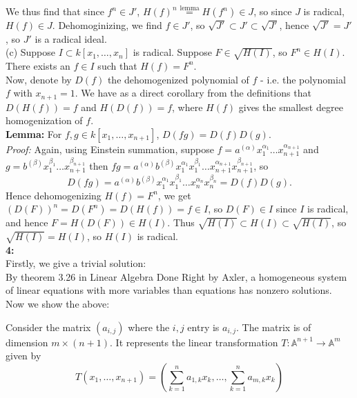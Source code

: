 \documentclass[a4paper]{article}
\begin{document}
We thus find that
since $f^{n} \in J'$, $H(f)^{n} \stackrel{\text{lemma}}{=} H(f^{n}) \in J$, so
since $J$ is radical, $H(f) \in J$. Dehomoginizing, we find
$f \in J'$, so $\sqrt{J'} \subset J' \subset \sqrt{J'} $, hence
$\sqrt{J'}  = J'$, so  $J'$ is a radical ideal.\\
\linebreak
(c) Suppose $I \subset k\left[ x_1, \ldots, x_n \right] $ is radical.
Suppose $F \in \sqrt{H(I)} $, so
$F^{n} \in H(I)$. There exists an $f \in I$ such that
$H(f) = F^{n}$.\\ Now, denote by
$D(f)$ the dehomogenized polynomial of $f$ - i.e. the polynomial $f$ with
$x_{n+1} = 1$. We have as a direct corollary from the definitions that
$D(H(f)) = f$ and $H(D(f)) = f$, where $H(f)$ gives the smallest degree
homogenization of $f$.\\
\textbf{Lemma:} For $f,g \in k\left[ x_1, \ldots, x_{n+1} \right] $, 
$D(fg) = D(f)D(g)$.\\
\textit{Proof:} Again, using Einstein summation, suppose
$f = a^{(\alpha)} x_1^{\alpha_1}\ldots x_{n+1}^{\alpha_{n+1}}$ and
$g = b^{(\beta)} x_1^{\beta_1}\ldots x_{n+1}^{\beta_{n+1}}$ then
$fg = a^{(\alpha)}b^{(\beta)}x_1^{\alpha_1}x_1^{\beta_1}\ldots
x_{n+1}^{\alpha_{n+1}}x_{n+1}^{\beta_{n+1}}$, so
\[
D(fg) = a^{(\alpha)}b^{(\beta)}
x_1^{\alpha_1}x_1^{\beta_1}\ldots x_{n}^{\alpha_{n}}x_{n}^{\beta_{n}}
= D(f) D(g).
\] 
Hence
dehomogenizing $H(f) = F^{n}$, we get
 $\left( D(F) \right)^{n} = D(F^{n}) = D(H(f)) = f \in I$, so
 $D(F) \in I$ since $I$ is radical, and hence
 $F = H(D(F)) \in H(I)$. Thus $\sqrt{H(I)} \subset H(I) \subset \sqrt{H(I)} $,
 so
 $\sqrt{H(I)} = H(I)$, so $H(I)$ is radical.\\
 \linebreak
 \textbf{4:}\\
Firstly, we give a trivial solution:\\
By theorem 3.26 in Linear Algebra Done Right by Axler, a homogeneous system of
linear equations with more variables than equations has nonzero solutions.\\
\linebreak
Now we show the above:

Consider the matrix $\left( a_{i,j} \right) $ where the $i,j$ entry is
$a_{i,j}$. The matrix is of dimension $m \times (n+1)$. It represents the
linear transformation $T  \colon \mathbb{A}^{n+1} \to \mathbb{A}^{m}$ given by
\[
T(x_1, \ldots, x_{n+1}) 
= \left( \sum_{k=1}^{n} a_{1,k} x_k,\ldots
, \sum_{k=1}^{n} a_{m,k} x_k \right) 
\] 
\end{document}
